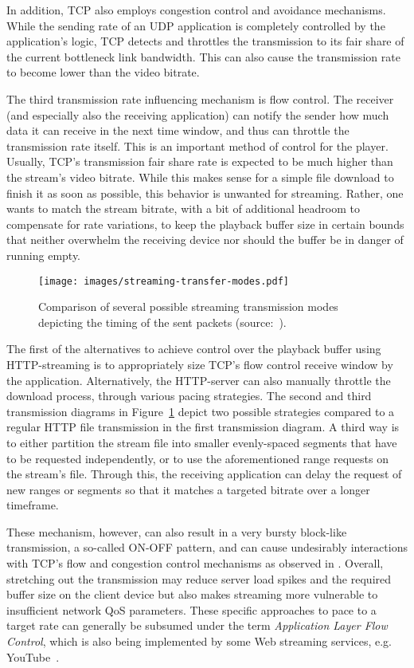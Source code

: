 In addition, \gls{TCP} also employs congestion control and avoidance mechanisms. While the sending rate of an \gls{UDP} application is completely controlled by the application's logic, \gls{TCP} detects and throttles the transmission to its fair share of the current bottleneck link bandwidth. This can also cause the transmission rate to become lower than the video bitrate. 

The third transmission rate influencing mechanism is flow control. The receiver (and especially also the receiving application) can notify the sender how much data it can receive in the next time window, and thus can throttle the transmission rate itself. This is an important method of control for the player. Usually, \gls{TCP}'s transmission fair share rate is expected to be much higher than the stream's video bitrate. While this makes sense for a simple file download to finish it as soon as possible, this behavior is unwanted for streaming. Rather, one wants to match the stream bitrate, with a bit of additional headroom to compensate for rate variations, to keep the playback buffer size in certain bounds that neither overwhelm the receiving device nor should the buffer be in danger of running empty. 

\begin{figure}[htbp]
	\centering
	\texttt{[image: images/streaming-transfer-modes.pdf]}
	\caption{Comparison of several possible streaming transmission modes depicting the timing of the sent packets (source:~\cite{ma2011mobile}).}
\label{c3:fig:streamingtransfermodes}
\end{figure}

The first of the alternatives to achieve control over the playback buffer using \gls{HTTP}-streaming is to appropriately size \gls{TCP}'s flow control receive window by the application. 
Alternatively, the \gls{HTTP}-server can also manually throttle the download process, through various pacing strategies. The second and third transmission diagrams in Figure~\ref{c3:fig:streamingtransfermodes} depict two possible strategies compared to a regular \gls{HTTP} file transmission in the first transmission diagram. A third way is to either partition the stream file into smaller evenly-spaced segments that have to be requested independently, or to use the aforementioned range requests on the stream's file. Through this, the receiving application can delay the request of new ranges or segments so that it matches a targeted bitrate over a longer timeframe.

These mechanism, however, can also result in a very bursty block-like transmission, a so-called ON-OFF pattern, and can cause undesirably interactions with \gls{TCP}'s flow and congestion control mechanisms as observed in \cite{alcock2011afcyt}. Overall, stretching out the transmission may reduce server load spikes and the required buffer size on the client device but also makes streaming more vulnerable to insufficient network \gls{QoS} parameters. These specific approaches to pace to a target rate can generally be subsumed under the term \textit{Application Layer Flow Control}, which is also being implemented by some Web streaming services, e.g. YouTube~\cite{metzger2011delivery}.

